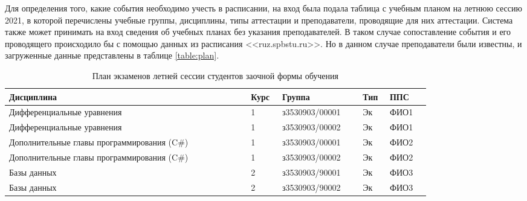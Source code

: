 Для определения того, какие события необходимо учесть в расписании, на вход была подала таблица с учебным планом на летнюю сессию 2021, в которой перечислены учебные группы, дисциплины, типы аттестации и преподаватели, проводящие для них аттестации. Система также может принимать на вход сведения об учебных планах без указания преподавателей. В таком случае сопоставление события и его проводящего происходило бы с помощью данных из расписания <<ruz.spbstu.ru>>. Но в данном случае преподаватели были известны, и загруженные данные представлены в таблице \ref{table:plan}.
\begin{table}[htbp]
	\centering\small 
	\caption{План экзаменов летней сессии студентов заочной формы обучения}%
	\begin{tabular}{|p{0.48\linewidth}|p{0.05\linewidth}|p{0.16\linewidth}|p{0.04\linewidth}|p{0.08\linewidth}|}
		\hline
		Дисциплина&Курс&Группа&Тип&ППС \\ 	\hline
		Дифференциальные уравнения                                                    & 1                                                & з3530903/00001                                     & Эк                                                         & ФИО1          \\ 	\hline
		Дифференциальные уравнения                                                    & 1                                                & з3530903/00002                                     & Эк                                                         & ФИО1          \\	\hline
		Дополнительные главы программирования (C\#)                                   & 1                                                & з3530903/00001                                     & Эк                                                         & ФИО2          \\ 	\hline
		Дополнительные главы программирования (C\#)                                   & 1                                                & з3530903/00002                                     & Эк                                                         & ФИО2          \\ 	\hline
		Базы данных                                                                   & 2                                                & з3530903/90001                                     & Эк                                                         & ФИО3          \\	\hline
		Базы данных                                                                   & 2                                                & з3530903/90002                                     & Эк                                                         & ФИО3          \\	\hline

\end{tabular}
\end{table}

